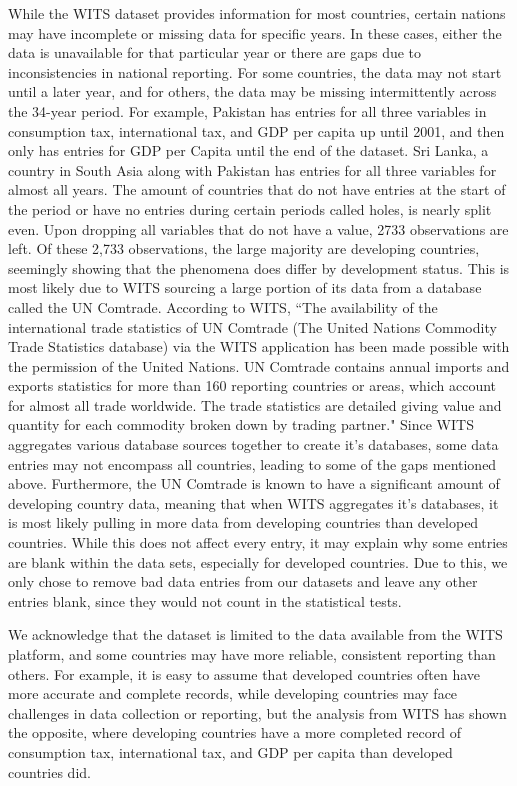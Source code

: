 \documentclass[12pt]{article}
\begin{document}
While the WITS dataset provides information for most countries, certain nations may have incomplete or missing data for specific years. In these cases, either the data is unavailable for that particular year or there are gaps due to inconsistencies in national reporting. For some countries, the data may not start until a later year, and for others, the data may be missing intermittently across the 34-year period. For example, Pakistan has entries for all three variables in consumption tax, international tax, and GDP per capita up until 2001, and then only has entries for GDP per Capita until the end of the dataset. Sri Lanka, a country in South Asia along with Pakistan has entries for all three variables for almost all years. The amount of countries that do not have entries at the start of the period or have no entries during certain periods called holes, is nearly split even. Upon dropping all variables that do not have a value, 2733 observations are left. Of these 2,733 observations, the large majority are developing countries, seemingly showing that the phenomena does differ by development status. This is most likely due to WITS sourcing a large portion of its data from a database called the UN Comtrade. According to WITS, ``The availability of the international trade statistics of UN Comtrade (The United Nations Commodity Trade Statistics database) via the WITS application has been made possible with the permission of the United Nations. UN Comtrade contains annual imports and exports statistics for more than 160 reporting countries or areas, which account for almost all trade worldwide. The trade statistics are detailed giving value and quantity for each commodity broken down by trading partner." Since WITS aggregates various database sources together to create it's databases, some data entries may not encompass all countries, leading to some of the gaps mentioned above. Furthermore, the UN Comtrade is known to have a significant amount of developing country data, meaning that when WITS aggregates it's databases, it is most likely pulling in more data from developing countries than developed countries. While this does not affect every entry, it may explain why some entries are blank within the data sets, especially for developed countries. Due to this, we only chose to remove bad data entries from our datasets and leave any other entries blank, since they would not count in the statistical tests. 

We acknowledge that the dataset is limited to the data available from the WITS platform, and some countries may have more reliable, consistent reporting than others. For example, it is easy to assume that developed countries often have more accurate and complete records, while developing countries may face challenges in data collection or reporting, but the analysis from WITS has shown the opposite, where developing countries have a more completed record of consumption tax, international tax, and GDP per capita than developed countries did. 
\end{document}
